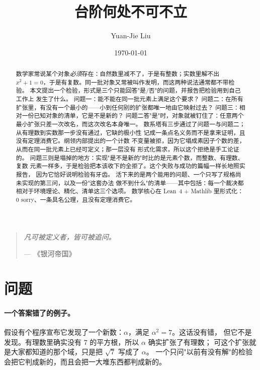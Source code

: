 \documentclass[aps,prd,preprint,superscriptaddress,amsmath,amssymb]{revtex4-2}
\begin{document}
\title{台阶何处不可不立}

\author{Yuan-Jie Liu}

\date{\today}

\begin{abstract}
数学家常说某个对象\emph{必须}存在：自然数里减不了，于是有整数；实数里解不出
$x^2+1=0$，于是有复数。同一批对象又常被叫作发明，而这两种说法通常都不带检验。
本文提出一个检验，形式是三个只能回答"是/否"的问题，并报告把检验用到自己工作上
发生了什么。
问题一：能不能在同一批元素上满足这个要求？
问题二：在所有扩张里，有没有一个最小的——小到任何别的扩张都唯一地由它映射过去？
问题三：相对一份已知对象的清单，它是不是新的？
问题二答"是"时，对象就被钉住了：任意两个最小扩张只差一次改名，而这次改名本身唯一。
数系塔有三步通过了问题一与问题二；从有理数到实数那一步没有通过，它缺的极小性
记成一条点名义务而不是拿来证明，且没有定理消费它。纲领内部提出的一个计数
不变量被拒，因为它塌成素因子个数的差，从而在同一批元素上已经可定义；那一层没有
形式化需求，所以这个拒绝是手工论证的。
问题三则是塌掉的地方：实现"是不是新的"时比的是元素个数，而整数、有理数、复数
元素一样多，于是检验把本该收下的全拒了。这个失败与成功的篇幅一样长地照实报告，
因为它恰好说明检验有牙齿。
活下来的是两个能用的问题、一个只写了规格尚未实现的第三问，以及一份"这套办法
做不到什么"的清单——其中包括：每一个裁决都相对于环境理论、精化、清单这三个选项。
数学核心在 Lean~4 + Mathlib 里形式化：0 sorry、一条具名公理，且没有定理消费它。
\end{abstract}

\maketitle

\begin{quote}
\itshape
凡可被定义者，皆可被追问。
\par
\vspace{0.4em}
--- 《银河帝国》
\end{quote}

\section{问题}
\label{sec:question}

\paragraph{一个答案错了的例子。}
假设有个程序宣布它发现了一个新数：$\alpha$，满足 $\alpha^2=7$。这话没有错，
但它不是发现。有理数里确实没有 $7$ 的平方根，所以 $\alpha$ 确实扩张了有理数；
可这个扩张就是大家都知道的那个域，只是把 $\sqrt 7$ 写成了 $\alpha$。
一个只问"以前有没有解"的检验会把它判成新的，而且会把一大堆东西都判成新的。
\end{document}
